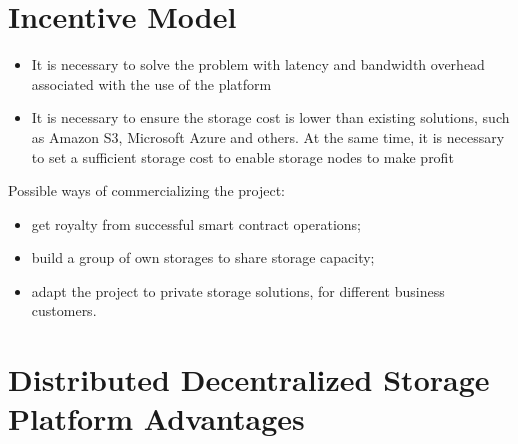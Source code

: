 \documentclass[a4paper, 11pt]{article}
\begin{document}
\vspace{2mm}

\section{Incentive Model}

\begin{itemize}
    \item It is necessary to solve the problem with latency and bandwidth
      overhead associated with the use of the platform

    \item It is necessary to ensure the storage cost is lower than existing
      solutions, such as Amazon S3, Microsoft Azure and others. At the same
      time, it is necessary to set a sufficient storage cost to enable storage
      nodes to make profit
\end{itemize}

Possible ways of commercializing the project:
\begin{itemize}
  \item get royalty from successful smart contract operations;
  \item build a group of own storages to share storage capacity;
  \item adapt the project to private storage solutions, for different business customers.
\end{itemize}

\vspace{2mm}

\vspace{10mm}

\section{Distributed Decentralized Storage Platform Advantages}
\end{document}
